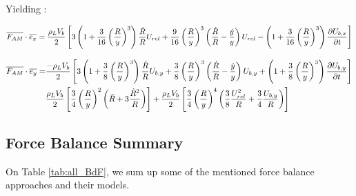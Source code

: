 Yielding :

\begin{align}
\overline{F_{AM}}\cdot \overline{e_{x}} = \frac{\rho_{L}V_{b}}{2}\left[ 3\left( 1+\frac{3}{16}\left( \frac{R}{y} \right)^{3}  \right) \frac{\dot{R}}{R}U_{rel} + \frac{9}{16}\left( \frac{R}{y} \right)^{3}\left( \frac{\dot{R}}{R}-\frac{\dot{y}}{y} \right)U_{rel} - \left( 1+\frac{3}{16}\left( \frac{R}{y} \right)^{3}  \right)\frac{\partial{U_{b,x}}}{\partial t} \right]
\end{align}



\begin{align}
\vect{F_{AM}}\cdot \vect{e_{y}} =& \frac{-\rho_{L}V_{b}}{2}\crocht{3\parth{1+\frac{3}{8}\parth{\frac{R}{y}}^{3} } \frac{\dot{R}}{R}U_{b,y} + \frac{3}{8}\parth{\frac{R}{y}}^{3}\parth{\frac{\dot{R}}{R}-\frac{\dot{y}}{y}}U_{b,y} + \parth{1+\frac{3}{8}\parth{\frac{R}{y}}^{3} }\dtime{U_{b,y}}}\\
%
&\frac{\rho_{L}V_{b}}{2}\crocht{\frac{3}{4} \parth{\frac{R}{y}}^{2}\parth{\ddot{R}+3\frac{\dot{R}^{2}}{R}} } + \frac{\rho_{L}V_{b}}{2} \crocht{\frac{3}{4}\parth{\frac{R}{y}}^{4}\parth{\frac{3}{8}\frac{U_{rel}^{2}}{R} + \frac{3}{4}\frac{U_{b,y}}{R}}}
\end{align}


\subsection{Force Balance Summary}\label{subsec:BdF}


On Table \ref{tab:all_BdF}, we sum up some of the mentioned force balance approaches and their models.



